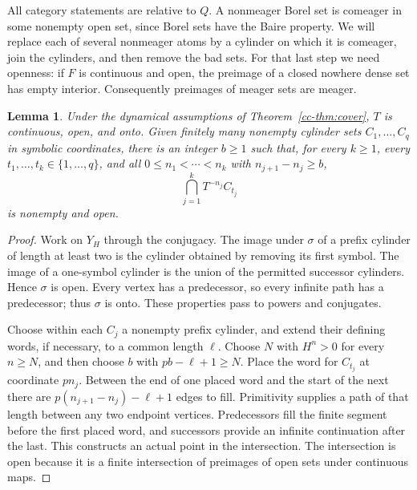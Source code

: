 \documentclass[11pt,reqno]{amsart}
\numberwithin{equation}{section}
\newtheorem{lemma}[theorem]{Lemma}
\theoremstyle{definition}
\theoremstyle{definition}
\begin{document}
All category statements are relative to $Q$. A nonmeager Borel set is
comeager in some nonempty open set, since Borel sets have the Baire
property. We will replace each of several nonmeager atoms by a cylinder
on which it is comeager, join the cylinders, and then remove the bad
sets. For that last step we need openness: if $F$ is continuous and
open, the preimage of a closed nowhere dense set has empty interior.
Consequently preimages of meager sets are meager.

\begin{lemma}\label{cc-lem:glue}
Under the dynamical assumptions of Theorem~\ref{cc-thm:cover}, $T$ is
continuous, open, and onto. Given finitely many nonempty cylinder sets
$C_1,\ldots,C_q$ in symbolic coordinates, there is an integer $b\ge1$
such that, for every $k\ge1$, every $t_1,\ldots,t_k\in\{1,\ldots,q\}$,
and all $0\le n_1<\cdots<n_k$ with $n_{j+1}-n_j\ge b$,
\[
 \bigcap_{j=1}^k T^{-n_j}C_{t_j}
\]
is nonempty and open.
\end{lemma}
\begin{proof}
Work on $Y_H$ through the conjugacy. The image under $\sigma$ of a
prefix cylinder of length at least two is the cylinder obtained by
removing its first symbol. The image of a one-symbol cylinder is the
union of the permitted successor cylinders. Hence $\sigma$ is open.
Every vertex has a predecessor, so every infinite path has a predecessor;
thus $\sigma$ is onto. These properties pass to powers and conjugates.

Choose within each $C_j$ a nonempty prefix cylinder, and extend their
defining words, if necessary, to a common length $\ell$. Choose $N$ with
$H^n>0$ for every $n\ge N$, and then choose $b$ with
$pb-\ell+1\ge N$. Place the word for $C_{t_j}$ at coordinate $pn_j$.
Between the end of one placed word and the start of the next there are
$p(n_{j+1}-n_j)-\ell+1$ edges to fill. Primitivity supplies a path of
that length between any two endpoint vertices. Predecessors fill the
finite segment before the first placed word, and successors provide an
infinite continuation after the last. This constructs an actual point
in the intersection. The intersection is open because it is a finite
intersection of preimages of open sets under continuous maps.
\end{proof}
\end{document}

